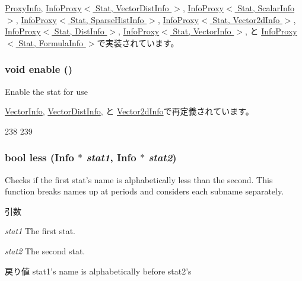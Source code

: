 \hyperlink{classStats_1_1ProxyInfo_a6ecddb2c44556b7acbc1723a968ff8bb}{ProxyInfo}, \hyperlink{classStats_1_1InfoProxy_a6ecddb2c44556b7acbc1723a968ff8bb}{InfoProxy$<$ Stat, VectorDistInfo $>$}, \hyperlink{classStats_1_1InfoProxy_a6ecddb2c44556b7acbc1723a968ff8bb}{InfoProxy$<$ Stat, ScalarInfo $>$}, \hyperlink{classStats_1_1InfoProxy_a6ecddb2c44556b7acbc1723a968ff8bb}{InfoProxy$<$ Stat, SparseHistInfo $>$}, \hyperlink{classStats_1_1InfoProxy_a6ecddb2c44556b7acbc1723a968ff8bb}{InfoProxy$<$ Stat, Vector2dInfo $>$}, \hyperlink{classStats_1_1InfoProxy_a6ecddb2c44556b7acbc1723a968ff8bb}{InfoProxy$<$ Stat, DistInfo $>$}, \hyperlink{classStats_1_1InfoProxy_a6ecddb2c44556b7acbc1723a968ff8bb}{InfoProxy$<$ Stat, VectorInfo $>$}, と \hyperlink{classStats_1_1InfoProxy_a6ecddb2c44556b7acbc1723a968ff8bb}{InfoProxy$<$ Stat, FormulaInfo $>$}で実装されています。\hypertarget{classStats_1_1Info_a486f22824bd83c5308a0d70ffac6f758}{
\subsubsection[{enable}]{\setlength{\rightskip}{0pt plus 5cm}void enable ()}}
\label{classStats_1_1Info_a486f22824bd83c5308a0d70ffac6f758}
Enable the stat for use 

\hyperlink{classStats_1_1VectorInfo_a486f22824bd83c5308a0d70ffac6f758}{VectorInfo}, \hyperlink{classStats_1_1VectorDistInfo_a486f22824bd83c5308a0d70ffac6f758}{VectorDistInfo}, と \hyperlink{classStats_1_1Vector2dInfo_a486f22824bd83c5308a0d70ffac6f758}{Vector2dInfo}で再定義されています。


\begin{DoxyCode}
238 {
239 }
\end{DoxyCode}
\hypertarget{classStats_1_1Info_a18124663e275538807e057c989ef2a3a}{
\subsubsection[{less}]{\setlength{\rightskip}{0pt plus 5cm}bool less ({\bf Info} $\ast$ {\em stat1}, \/  {\bf Info} $\ast$ {\em stat2})}}
\label{classStats_1_1Info_a18124663e275538807e057c989ef2a3a}
Checks if the first stat's name is alphabetically less than the second. This function breaks names up at periods and considers each subname separately. 
\begin{DoxyParams}{引数}
\item[{\em stat1}]The first stat. \item[{\em stat2}]The second stat. \end{DoxyParams}
\begin{DoxyReturn}{戻り値}
stat1's name is alphabetically before stat2's 
\end{DoxyReturn}



